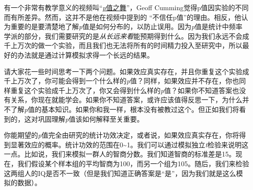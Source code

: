 \documentclass[
  letterpaper,
  DIV=11,
  numbers=noendperiod]{scrreprt}
\newenvironment{Shaded}{\begin{snugshade}}{\end{snugshade}}
\newcommand{\AttributeTok}[1]{\textcolor[rgb]{0.40,0.45,0.13}{#1}}
\newcommand{\CommentTok}[1]{\textcolor[rgb]{0.37,0.37,0.37}{#1}}
\newcommand{\ControlFlowTok}[1]{\textcolor[rgb]{0.00,0.23,0.31}{#1}}
\newcommand{\DecValTok}[1]{\textcolor[rgb]{0.68,0.00,0.00}{#1}}
\newcommand{\FloatTok}[1]{\textcolor[rgb]{0.68,0.00,0.00}{#1}}
\newcommand{\FunctionTok}[1]{\textcolor[rgb]{0.28,0.35,0.67}{#1}}
\newcommand{\NormalTok}[1]{\textcolor[rgb]{0.00,0.23,0.31}{#1}}
\newcommand{\OtherTok}[1]{\textcolor[rgb]{0.00,0.23,0.31}{#1}}
\newcommand{\SpecialCharTok}[1]{\textcolor[rgb]{0.37,0.37,0.37}{#1}}
\begin{document}
有一个非常有教学意义的视频叫``\href{https://www.youtube.com/watch?v=5OL1RqHrZQ8}{\emph{p}值之舞}''，Geoff
Cumming觉得p值因实验的不同而有所差异。然而，这并不是他在视频中提到的
``不信任p值''的理由。相反，他认为重要的是要清楚地了解\emph{p}值是如何分布的，以防止误用。因为\emph{p}值是统计中频率学派的部分，我们需要研究的是\emph{从长远来看}能预期得到什么。因为我们永远不会成千上万次的做一个实验，而且我们也无法将所有的时间精力投入至研究中，所以最好的办法就是通过计算模拟求得一个长远的结果。

请大家花一些时间思考一下两个问题。如果效应真实存在，并且你重复这个实验成千上万次了，你可能会得到一个什么样的\emph{p}值？同样，如果效应并不存在，你也同样重复这个实验成千上万次了，你又会得到什么样的\emph{p}值？如果你不知道答案也没有关系，你现在就能学会。如果你不知道答案，或许应该值得反思一下，为什么并不了解\emph{p}值的基本知识。如果你和我一样，根本没有被教过这个。但正如我们将看到的，这对巩固理解\emph{p}值该如何解释至关重要。

你能期望的\emph{p}值完全由研究的统计功效决定，或者说，如果效应真实存在，你将得到显著效应的概率。统计功效的范围在0\textasciitilde1。我们可以通过模拟独立\emph{t}检验来说明这一点。比如说，我们来模拟一群人的智商分数。我们知道智商的标准差是15。现在，我们假设某个样本组的平均智商为100，而另一个组为105。随后，我们来检验这两组人的IQ是否不一致（但是我们知道正确答案是``是''，因为我们就是这么模拟的数据）。

\begin{Shaded}
\end{Shaded}
\end{document}
